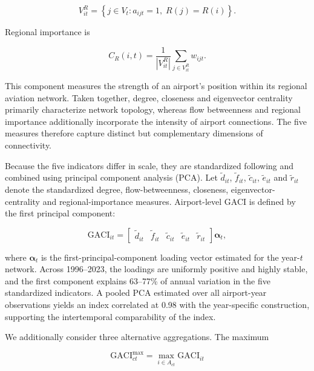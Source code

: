 \documentclass[12pt]{extarticle}
\begin{document}
\begin{equation}
V^R_{it}
=
\left\{
j\in V_t:
a_{ijt}=1,\;
R(j)=R(i)
\right\}.
\label{eq:nature_15}
\end{equation}

Regional importance is

\begin{equation}
C_R(i,t)
=
\frac{1}{|V^R_{it}|}
\sum_{j\in V^R_{it}}
w_{ijt}.
\label{eq:nature_16}
\end{equation}

This component measures the strength of an airport's position within its regional aviation network. Taken together, degree, closeness and eigenvector centrality primarily characterize network topology, whereas flow betweenness and regional importance additionally incorporate the intensity of airport connections. The five measures therefore capture distinct but complementary dimensions of connectivity.

Because the five indicators differ in scale, they are standardized following \citet{cheung2020} and combined using principal component analysis (PCA). Let $\tilde d_{it}$, $\tilde f_{it}$, $\tilde c_{it}$, $\tilde e_{it}$ and $\tilde r_{it}$ denote the standardized degree, flow-betweenness, closeness, eigenvector-centrality and regional-importance measures. Airport-level GACI is defined by the first principal component:

\begin{equation}
\mathrm{GACI}_{it}
=
\begin{bmatrix}
\tilde d_{it} &
\tilde f_{it} &
\tilde c_{it} &
\tilde e_{it} &
\tilde r_{it}
\end{bmatrix}
\boldsymbol{\alpha}_t ,
\label{eq:nature_17}
\end{equation}

where $\boldsymbol{\alpha}_t$ is the first-principal-component loading vector estimated for the year-$t$ network. Across 1996--2023, the loadings are uniformly positive and highly stable, and the first component explains 63--77\% of annual variation in the five standardized indicators. A pooled PCA estimated over all airport-year observations yields an index correlated at 0.98 with the year-specific construction, supporting the intertemporal comparability of the index.

We additionally consider three alternative aggregations. The maximum

\begin{equation}
\mathrm{GACI}^{\max}_{ct}
=
\max_{i\in A_{ct}}
\mathrm{GACI}_{it}
\label{eq:nature_19}
\end{equation}
\end{document}

